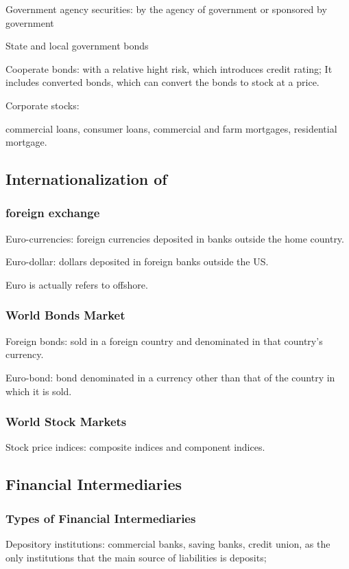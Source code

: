 \documentclass[10pt, a4paper]{article}
\begin{document}
                Government agency securities: by the agency of government or sponsored by government

                State and local government bonds 

                Cooperate bonds: with a relative hight risk, which introduces credit rating; It includes converted bonds, which can convert the bonds to stock at a price. 

                Corporate stocks:
                
                commercial loans, consumer loans, commercial and farm mortgages, residential mortgage.
    \subsection{Internationalization of}
        \subsubsection{foreign exchange}
        
            Euro-currencies: foreign currencies deposited in banks outside the home country.

            Euro-dollar: dollars deposited in foreign banks outside the US. 

            Euro is actually refers to offshore. 
        \subsubsection{World Bonds Market}
            Foreign bonds: sold in a foreign country and denominated in that country's currency. 

            Euro-bond: bond denominated in a currency other than that of the country in which it is sold. 
        \subsubsection{World Stock Markets}
            Stock price indices: composite indices and component indices.
    \subsection{Financial Intermediaries}
        \subsubsection{Types of Financial Intermediaries}
            Depository institutions: commercial banks, saving banks, credit union, as the only institutions that the main source of liabilities is deposits;  
\end{document}
